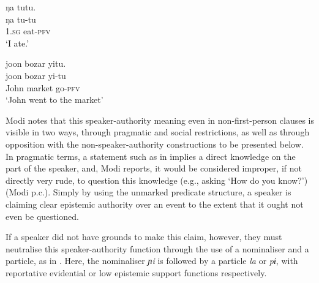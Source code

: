 \begin{exe}
        \ex\label{e:Description:MilangEgo}
        \begin{xlist}
        \ex \label{e:Description:MilangEgo1}
        \glll ŋa tutu. \\
        ŋa tu-tu \\
         1.\textsc{sg} eat-\textsc{pfv} \\
         \glt `I ate.' \\
         \cite[Milang,][455]{Modi2017}

        \ex \label{e:Description:MilangEgo2}
        \glll joon bozar yitu. \\
        joon bozar yi-tu \\
        John market go-\textsc{pfv} \\
        \glt `John went to the market' \\
        \cite[Milang,][456]{Modi2017}
        \end{xlist}
        
\end{exe}

Modi notes that this speaker-authority meaning even in non-first-person clauses is visible in two ways, through pragmatic and social restrictions, as well as through opposition with the non-speaker-authority constructions to be presented below. In pragmatic terms, a statement such as in  implies a direct knowledge on the part of the speaker, and, Modi reports, it would be considered improper, if not directly very rude, to question this knowledge (e.g., asking `How do you know?') (Modi p.c.). Simply by using the unmarked predicate structure, a speaker is claiming clear epistemic authority over an event to the extent that it ought not even be questioned.

If a speaker did not have grounds to make this claim, however, they must neutralise this speaker-authority function through the use of a nominaliser and a particle, as in . Here, the nominaliser \textit{ɲi} is followed by a particle \textit{la} or \textit{pɨ}, with reportative evidential or low epistemic support functions respectively.

